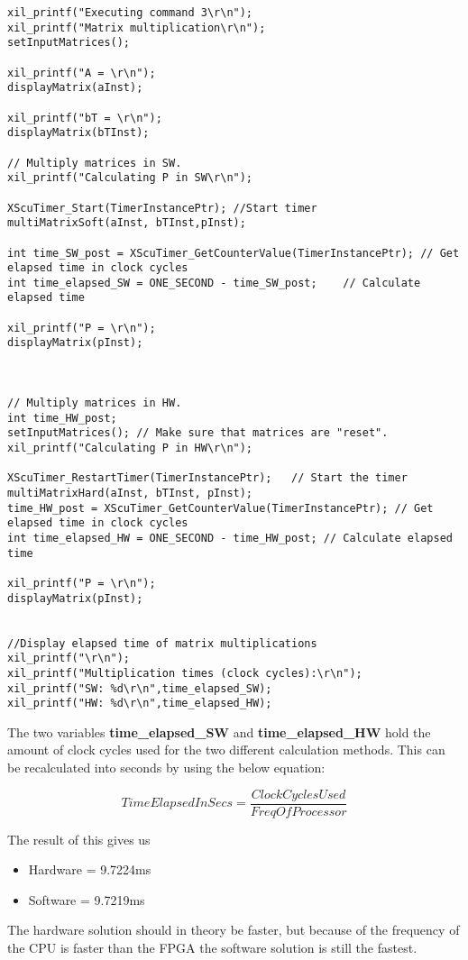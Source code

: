 \begin{lstlisting}
xil_printf("Executing command 3\r\n");
xil_printf("Matrix multiplication\r\n");
setInputMatrices();

xil_printf("A = \r\n");
displayMatrix(aInst);

xil_printf("bT = \r\n");
displayMatrix(bTInst);

// Multiply matrices in SW.
xil_printf("Calculating P in SW\r\n");

XScuTimer_Start(TimerInstancePtr); //Start timer
multiMatrixSoft(aInst, bTInst,pInst);

int time_SW_post = XScuTimer_GetCounterValue(TimerInstancePtr); // Get elapsed time in clock cycles
int time_elapsed_SW = ONE_SECOND - time_SW_post;	// Calculate elapsed time

xil_printf("P = \r\n");
displayMatrix(pInst);



// Multiply matrices in HW.
int time_HW_post;
setInputMatrices(); // Make sure that matrices are "reset".
xil_printf("Calculating P in HW\r\n");

XScuTimer_RestartTimer(TimerInstancePtr); 	// Start the timer
multiMatrixHard(aInst, bTInst, pInst);
time_HW_post = XScuTimer_GetCounterValue(TimerInstancePtr); // Get elapsed time in clock cycles
int time_elapsed_HW = ONE_SECOND - time_HW_post; // Calculate elapsed time

xil_printf("P = \r\n");
displayMatrix(pInst);


//Display elapsed time of matrix multiplications
xil_printf("\r\n");
xil_printf("Multiplication times (clock cycles):\r\n");
xil_printf("SW: %d\r\n",time_elapsed_SW);
xil_printf("HW: %d\r\n",time_elapsed_HW);

\end{lstlisting}

The two variables \textbf{time\_elapsed\_SW} and \textbf{time\_elapsed\_HW} hold the amount of clock cycles used for the two different calculation methods. This can be recalculated into seconds by using the below equation:

\[ TimeElapsedInSecs = \dfrac{ClockCyclesUsed}{FreqOfProcessor} \]

The result of this gives us
\begin{itemize}
	\item Hardware = 9.7224ms
	
	\item Software = 9.7219ms
\end{itemize}

The hardware solution should in theory be faster, but because of the frequency of the CPU is faster than the FPGA the software solution is still the fastest.